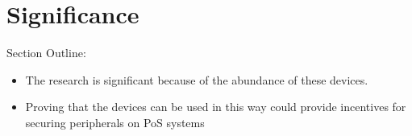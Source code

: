 \chapter{\leavevmode Significance}
\label{chap:significance}

Section Outline:
\begin{itemize}
  \item The research is significant because of the abundance of these devices.
  \item Proving that the devices can be used in this way could provide incentives for securing peripherals on PoS systems
\end{itemize}

